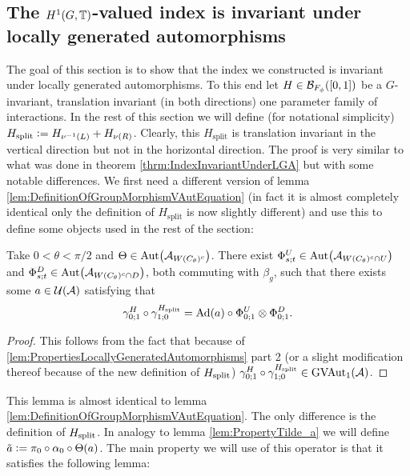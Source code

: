 \documentclass[12pt,a4paper,twoside]{article}
\numberwithin{equation}{section}
\begin{document}
\subsection{The $H^1(G,\TT)$-valued index is invariant under locally generated automorphisms}\label{sec:H1ValuedIndexInvariantUnderLGA's}
The goal of this section is to show that the index we constructed is invariant under locally generated automorphisms. To this end let $H\in \BB_{F_\phi}([0,1])$ be a $G$-invariant, translation invariant (in both directions) one parameter family of interactions. In the rest of this section we will define (for notational simplicity) $H_{\text{split}}\defeq H_{\nu^{-1}(L)}+H_{\nu(R)}$. Clearly, this $H_{\text{split}}$ is translation invariant in the vertical direction but not in the horizontal direction. The proof is very similar to what was done in theorem \ref{thrm:IndexInvariantUnderLGA} but with some notable differences. We first need a different version of lemma \ref{lem:DefinitionOfGroupMorphismVAutEquation} (in fact it is almost completely identical only the definition of $H_{\text{split}}$ is now slightly different) and use this to define some objects used in the rest of the section:
\begin{lemma}\label{lem:DefinitionOfGroupMorphismVAutEquationTwoTranslations}
	Take $0<\theta<\pi/2$ and $\Theta\in \Aut{\AA_{W(C_\theta)^c}}$. There exist $\Phi^U_{s;t}\in\Aut{\AA_{W(C_\theta)^c\cap U}}$ and $\Phi^D_{s;t}\in\Aut{\AA_{W(C_\theta)^c\cap D}}$, both commuting with $\beta_g$, such that there exists some $a\in\UU(\AA)$ satisfying that
	\begin{equation}\label{eq:DefinitionOfGroupMorphismVAutEquationTwoTranslations}
	\gamma^H_{0;1}\circ\gamma^{H_\text{split}}_{1;0}=\Ad{a}\circ \Phi^U_{0;1}\otimes\Phi^D_{0;1}.
	\end{equation}
\end{lemma}
\begin{proof}
	This follows from the fact that because of \ref{lem:PropertiesLocallyGeneratedAutomorphisms} part 2 (or a slight modification thereof because of the new definition of $\Hsplit$) $\gamma^H_{0;1}\circ\gamma^{H_\text{split}}_{1;0}\in \textrm{GVAut}_1(\AA)$.
\end{proof}
This lemma is almost identical to lemma \ref{lem:DefinitionOfGroupMorphismVAutEquation}. The only difference is the definition of $\Hsplit$. In analogy to lemma \ref{lem:PropertyTilde_a} we will define $\tilde{a}\defeq \pi_0\circ\alpha_0\circ\Theta(a)$. The main property we will use of this operator is that it satisfies the following lemma:
\end{document}
